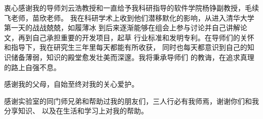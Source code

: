 \begin{acknowledgement}
  衷心感谢我的导师刘云浩教授和一直给予我科研指导的软件学院杨铮副教授，毛续飞老师，苗欣老师。
  我在科研学术上收到他们潜移默化的影响，从进入清华大学第一天的战战兢兢，如履薄冰
  到后来逐渐能够在组会上参与讨论并自己讲解论文，再到自己承担重要的开发项目，起草
  行业标准和发明专利。在导师们的关怀和指导下，我在研究生三年里每天都能有所收获，
  同时也每天都意识到自己的知识储备薄弱，知识的殿堂愈发壮美而深邃。我将秉承导师们
  的教诲，在追求真理的路上自强不息。

  感谢我的父母，自始至终对我的关心爱护。

  感谢实验室的同门师兄弟和帮助过我的朋友们，三人行必有我师焉，谢谢你们和我分享知识、
  以及在生活和学习上对我的帮助。
\end{acknowledgement}
